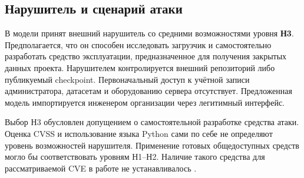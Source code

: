 \documentclass[12pt,a4paper]{report}
\begin{document}
\subsection{Нарушитель и сценарий атаки}

В модели принят внешний нарушитель со средними возможностями уровня \textbf{Н3}. Предполагается, что он способен исследовать загрузчик и самостоятельно разработать средство эксплуатации, предназначенное для получения закрытых данных проекта. Нарушителем контролируется внешний репозиторий либо публикуемый checkpoint. Первоначальный доступ к учётной записи администратора, датасетам и оборудованию сервера отсутствует. Предложенная модель импортируется инженером организации через легитимный интерфейс.

Выбор Н3 обусловлен допущением о самостоятельной разработке средства атаки. Оценка CVSS и использование языка Python сами по себе не определяют уровень возможностей нарушителя. Применение готовых общедоступных средств могло бы соответствовать уровням Н1--Н2. Наличие такого средства для рассматриваемой CVE в работе не устанавливалось \cite{fstekmethod}.
\end{document}
